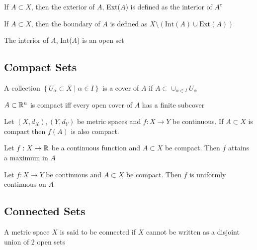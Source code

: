 \begin{definition}
    \label{def:set_exterior}
    If $A\subset X$, then the exterior of $A$, Ext($A$) is defined as the interior of $A^c$
\end{definition}

\begin{definition}
    \label{def:set_boundary}
    If $A\subset X$, then the boundary of $A$ is defined as $X \setminus (\text{Int}(A) \cup \text{Ext}(A))$
\end{definition}

\begin{fact}
    The interior of $A$, Int($A$) is an open set
\end{fact}



\subsection{Compact Sets}
\begin{definition}
    \label{def:set_cover}
    A collection $\left\{U_\alpha \subset X \mid \alpha \in I \right\}$ is a cover of $A$ if $A  \subset \cup_{\alpha \in I} U_\alpha$
\end{definition}

\begin{theorem}
    \label{heine_borel}
    $A \subset \mathbb R^n$ is compact iff every open cover of $A$ has a finite subcover
\end{theorem}

\begin{fact}
    Let $(X, d_X), (Y, d_Y)$ be metric spaces and $f:X \to Y$ be continuous. If $A\subset X$ is compact then $f(A)$ is also compact.
\end{fact}

\begin{fact}
    Let $f: X \to \mathbb R$ be a continuous function and $A\subset X$ be compact. Then $f$ attains a maximum in $A$
\end{fact}

\begin{fact}
    Let $f: X \to Y$ be continuous and $A\subset X$ be compact. Then $f$ is uniformly continuous on $A$
\end{fact}



\subsection{Connected Sets}
\begin{definition}
    \label{def:connected_space}
    A metric space $X$ is said to be connected if $X$ cannot be written as a disjoint union of 2 open sets
\end{definition}

